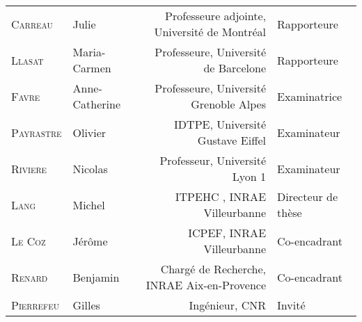 \begin{adjustwidth}{-0.8cm}{}
\begin{center}
\noindent \normalsize 
\begin{tabular}{llrl}
    	\textsc{Carreau} & Julie & {\small Professeure adjointe}, Université de Montréal & Rapporteure\\
    	\textsc{Llasat} & Maria-Carmen & {\small Professeure}, Université de Barcelone & Rapporteure\\
    	\textsc{Favre}	& Anne-Catherine & {\small Professeure}, Université Grenoble Alpes & Examinatrice\\
      	\textsc{Payrastre} & Olivier & {\small IDTPE}, Université Gustave Eiffel & Examinateur\\
      	\textsc{Riviere} & Nicolas & {\small Professeur}, Université Lyon 1 & Examinateur\\
      	\textsc{Lang} & Michel &{\small ITPEHC }, INRAE Villeurbanne & Directeur de thèse \\
      	\textsc{Le Coz} & Jérôme & {\small ICPEF}, INRAE Villeurbanne & Co-encadrant\\
      	\textsc{Renard} & Benjamin&{\small Chargé de Recherche}, INRAE Aix-en-Provence& Co-encadrant\\
      	\textsc{Pierrefeu} & Gilles & {\small Ingénieur}, CNR & Invité \\
\end{tabular}
\end{center}
\end{adjustwidth}


\newpage
\thispagestyle{empty}

\restoregeometry

\vspace*{\fill}
%


\newpage



